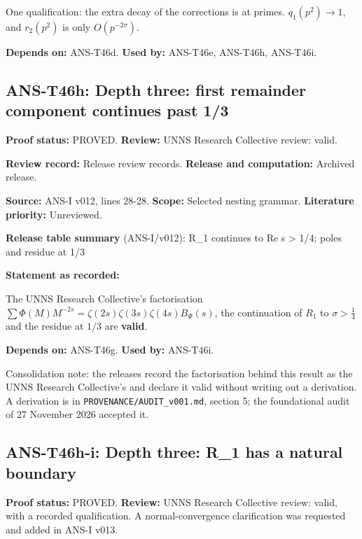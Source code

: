 \documentclass[
  11pt,
]{article}
\begin{document}
One qualification: the extra decay of the corrections is at primes.
\(q_1(p^2)\to1\), and \(r_2(p^2)\) is only \(O(p^{-2\sigma})\).

\textbf{Depends on:} ANS-T46d. \textbf{Used by:} ANS-T46e, ANS-T46h,
ANS-T46i.

\hypertarget{ans-t46h-depth-three-first-remainder-component-continues-past-13}{%
\subsection{ANS-T46h: Depth three: first remainder component continues
past
1/3}\label{ans-t46h-depth-three-first-remainder-component-continues-past-13}}

\textbf{Proof status:} PROVED. \textbf{Review:} UNNS Research Collective
review: valid.

\textbf{Review record:} Release review records. \textbf{Release and
computation:} Archived release.

\textbf{Source:} ANS-I v012, lines 28-28. \textbf{Scope:} Selected
nesting grammar. \textbf{Literature priority:} Unreviewed.

\textbf{Release table summary} (ANS-I/v012): R\_1 continues to Re s
\textgreater{} 1/4; poles and residue at 1/3

\textbf{Statement as recorded:}

The UNNS Research Collective's factorisation
\(\sum\Phi(M)M^{-2s}=\zeta(2s)\zeta(3s)\zeta(4s)B_\Phi(s)\), the
continuation of \(R_1\) to \(\sigma>\frac14\) and the residue at \(1/3\)
are \textbf{valid}.

\textbf{Depends on:} ANS-T46g. \textbf{Used by:} ANS-T46i.

Consolidation note: the releases record the factorisation behind this
result as the UNNS Research Collective's and declare it valid without
writing out a derivation. A derivation is in
\texttt{PROVENANCE/AUDIT\_v001.md}, section 5; the foundational audit of
27 November 2026 accepted it.

\hypertarget{ans-t46h-i-depth-three-r_1-has-a-natural-boundary}{%
\subsection{ANS-T46h-i: Depth three: R\_1 has a natural
boundary}\label{ans-t46h-i-depth-three-r_1-has-a-natural-boundary}}

\textbf{Proof status:} PROVED. \textbf{Review:} UNNS Research Collective
review: valid, with a recorded qualification. A normal-convergence
clarification was requested and added in ANS-I v013.
\end{document}
